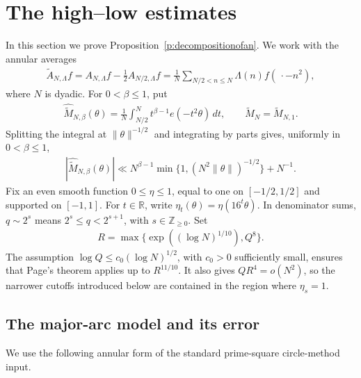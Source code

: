 \documentclass[12pt,reqno]{amsart}
\numberwithin{equation}{section}
\theoremstyle{definition}
\theoremstyle{remark}
\begin{document}
\section{The high--low estimates}\label{s:hilo}

In this section we prove Proposition~\ref{p:decompositionofan}.  We work
with the annular averages
\begin{align}\label{e:tildedef2}
     \widetilde A_{N,\Lambda}f
 =A_{N,\Lambda}f-\tfrac12A_{N/2,\Lambda}f
 =\frac1N\sum_{N/2<n\leq N}\Lambda(n)f(\,\cdot-n^2),
\end{align}
where \(N\) is dyadic. For \(0<\beta\leq1\), put
\begin{align}\label{e:M}
 \widehat{\widetilde M}_{N,\beta}(\theta)
 =\frac1N\int_{N/2}^{N}t^{\beta-1}e(-t^2\theta)\,dt,
 \qquad \widetilde M_N=\widetilde M_{N,1}.
\end{align}
Splitting the integral at \(\|\theta\|^{-1/2}\) and integrating by parts
gives, uniformly in \(0<\beta\leq1\),
\begin{align}\label{e:MNless}
 |\widehat{\widetilde M}_{N,\beta}(\theta)|
 \ll N^{\beta-1}\min\{1,(N^2\|\theta\|)^{-1/2}\}+N^{-1}.
\end{align}
Fix an even smooth function \(0\leq\eta\leq1\), equal to one on
\([-1/2,1/2]\) and supported on \([-1,1]\).  For \(t\in\mathbb R\),
write $\eta_t(\theta)=\eta(16^t\theta).$
In denominator sums, \(q\sim2^s\) means
\(2^s\leq q<2^{s+1}\), with \(s\in\mathbb Z_{\geq0}\).
Set
\begin{align}\label{e:defR}
 R=\max\{\exp((\log N)^{1/10}),Q^8\}.
\end{align}
The assumption
\(\log Q\leq c_0(\log N)^{1/2}\), with \(c_0>0\) sufficiently small,
ensures that Page's theorem applies up to \(R^{11/10}\).  It also gives
\(QR^4=o(N^2)\), so the narrower cutoffs introduced below are contained
in the region where \(\eta_s=1\).

\subsection{The major-arc model and its error}

We use the following annular form of the standard prime-square
circle-method input.
\end{document}
